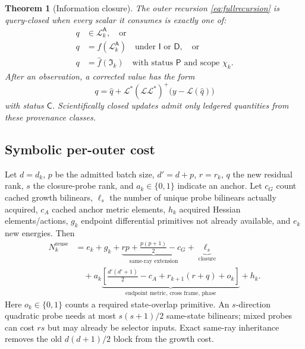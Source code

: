 \documentclass[10pt,twocolumn]{article}
\newcommand{\mathscr}[1]{\mathcal{#1}}
\newtheorem{theorem}{Theorem}[section]
\theoremstyle{definition}
\theoremstyle{remark}
\newcommand{\A}{\mathsf A}
\newcommand{\I}{\mathsf I}
\newcommand{\D}{\mathsf D}
\newcommand{\Prd}{\mathsf P}
\newcommand{\Cor}{\mathsf C}
\begin{document}
\begin{theorem}[Information closure]
The outer recursion \eqref{eq:fullrecursion} is query-closed when every scalar it consumes is exactly one of:
\begin{align}
 q&\in\mathscr L_k^{\A},\quad\text{or}\nonumber\\
 q&=f(\mathscr L_k^{\A})
 \quad\text{under }\I\text{ or }\D,\quad\text{or}\nonumber\\
 q&=\widehat f(\mathfrak I_k)
 \quad\text{with status }\Prd\text{ and scope }\chi_k.
 \label{eq:closuretheorem}
\end{align}
After an observation, a corrected value has the form
\begin{equation}
q=\widehat q+\mathcal L^*(\mathcal L\mathcal L^*)^+
\bigl(y-\mathcal L(\widehat q)\bigr)
\end{equation}
with status $\Cor$.  Scientifically closed updates admit only ledgered quantities from these provenance classes.
\end{theorem}

\subsection{Symbolic per-outer cost}

Let $d=d_k$, $p$ be the admitted batch size, $d'=d+p$, $r=r_k$, $q$ the new residual rank, $s$ the closure-probe rank, and $a_k\in\{0,1\}$ indicate an anchor.  Let $c_G$ count cached growth bilinears, $\ell_s$ the number of unique probe bilinears actually acquired, $c_A$ cached anchor metric elements, $h_k$ acquired Hessian elements/actions, $g_k$ endpoint differential primitives not already available, and $e_k$ new energies.  Then
\begin{align}
 N_k^{\mathrm{reuse}}
 &=e_k+g_k
 +\underbrace{rp+\frac{p(p+1)}2-c_G}_{\text{same-ray extension}}
 +\underbrace{\ell_s}_{\text{closure}}\nonumber\\
 &\quad+a_k\underbrace{\left[
 \frac{d'(d'+1)}2-c_A+r_{k+1}(r+q)+o_k\right]}_{\text{endpoint metric, cross frame, phase}}
 +h_k.
 \label{eq:reusecost}
\end{align}
Here $o_k\in\{0,1\}$ counts a required state-overlap primitive.  An $s$-direction quadratic probe needs at most $s(s+1)/2$ same-state bilinears; mixed probes can cost $rs$ but may already be selector inputs.  Exact same-ray inheritance removes the old $d(d+1)/2$ block from the growth cost.
\end{document}
